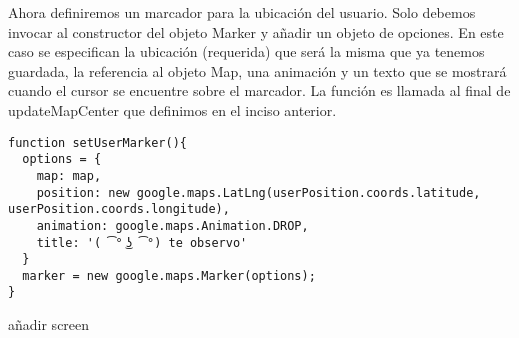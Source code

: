 Ahora definiremos un marcador para la ubicación del usuario. Solo debemos invocar al constructor del objeto Marker y añadir un objeto de opciones. En este caso se especifican la ubicación (requerida) que será la misma que ya tenemos guardada, la referencia al objeto Map, una animación y un texto que se mostrará cuando el cursor se encuentre sobre el marcador. La función es llamada al final de updateMapCenter que definimos en el inciso anterior.

\begin{lstlisting}
function setUserMarker(){
  options = {
    map: map,
    position: new google.maps.LatLng(userPosition.coords.latitude, userPosition.coords.longitude),
    animation: google.maps.Animation.DROP,
    title: '( ͡° ͜ʖ ͡°) te observo'
  }
  marker = new google.maps.Marker(options);
}
\end{lstlisting}

{{añadir screen}}
